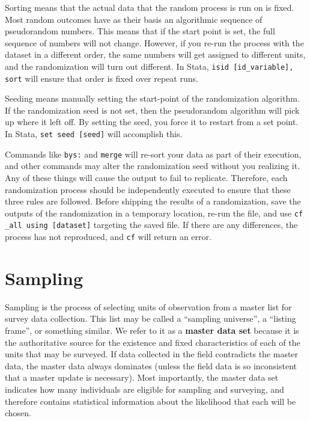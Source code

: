 Sorting means that the actual data that the random process is run on is fixed.
Most random outcomes have as their basis an algorithmic sequence of pseudorandom numbers.
This means that if the start point is set, the full sequence of numbers will not change.
However, if you re-run the process with the dataset in a different order,
the same numbers will get assigned to different units, and the randomization will turn out different.
In Stata, \texttt{isid [id\_variable], sort} will ensure that order is fixed over repeat runs.

Seeding means manually setting the start-point of the randomization algorithm.
If the randomization seed is not set, then the pseudorandom algorithm will pick up where it left off.
By setting the seed, you force it to restart from a set point.
In Stata, \texttt{set seed [seed]} will accomplish this.



Commands like \texttt{bys:} and \texttt{merge} will re-sort your data as part of their execution,
and other commands may alter the randomization seed without you realizing it.
Any of these things will cause the output to fail to replicate.
Therefore, each randomization process should be independently executed
to ensure that these three rules are followed.
Before shipping the results of a randomization,
save the outputs of the randomization in a temporary location,
re-run the file, and use \texttt{cf \_all using [dataset]} targeting the saved file.
If there are any differences, the process has not reproduced,
and \texttt{cf} will return an error.

\section{Sampling}

Sampling is the process of selecting units of observation from a master list for survey data collection.
This list may be called a ``sampling universe'', a ``listing frame'', or something similar.
We refer to it as a \textbf{master data set} because it is the authoritative source
for the existence and fixed characteristics of each of the units that may be surveyed.
If data collected in the field contradicts the master data,
the master data always dominates (unless the field data is so inconsistent that a master update is necessary).
Most importantly, the master data set indicates how many individuals are eligible for sampling and surveying,
and therefore contains statistical information about the likelihood that each will be chosen.

